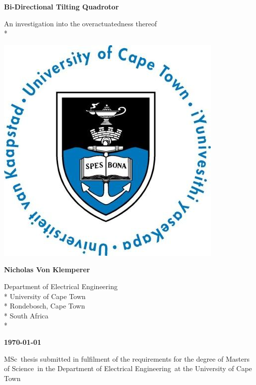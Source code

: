 \documentclass[a4paper, 11pt, oneside, openright, parskip=full]{book}
\newcommand{\auth}{Nicholas Von Klemperer}								%
\newcommand{\titl}{Bi-Directional Tilting Quadrotor}						%
\newcommand{\subtitle}{An investigation into the overactuatedness thereof}						%
\newcommand{\dept}{Department of Electrical Engineering}%
\newcommand{\uni}{University of Cape Town}				%
\newcommand{\city}{Rondebosch, Cape Town}				%
\newcommand{\country}{South Africa}						%
\newcommand{\degre}{Masters of Science}				%
\newcommand{\degreeabv}{MSc}							%
\newcommand{\supervisor}{Supervisor}					%
\newcommand{\logo}										%
{	
	\includegraphics[scale = 0.3]{figs/uctLogo}
}
\begin{document}
\begin{titlepage}
	\centering
	\vspace*{1cm}

	\begin{Huge}					
		\bfseries\titl\par
		\vskip 5mm
	\end{Huge}
	\begin{Large}					
		\subtitle\\*
		\vskip 3cm
	\end{Large}
	\logo							
	\vskip 1.5cm	
	\begin{Large}					
		\bfseries\auth\\
	\end{Large}
	\begin{normalsize}				
		\vskip 2mm	
		\dept\\*
		\uni\\*
		\city\\*
		\country\\*
		
		\vskip 15mm	
	\end{normalsize}
	\begin{Large}					
		{\bfseries \mydate\today}
		\vskip 15mm	
	\end{Large}
		\degreeabv\ thesis submitted in fulfilment of the requirements for the degree of \degre\ in the \dept\ at the \uni
		

\end{titlepage}
\end{document}
